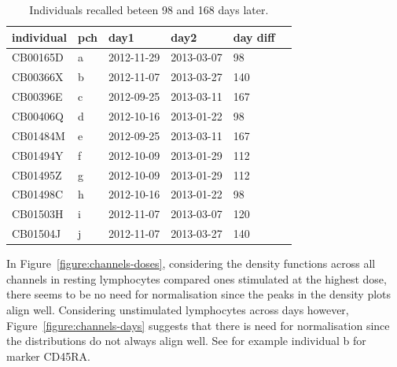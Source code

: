 \begin{table}[ht]
\centering
\begin{tabular}{llllll}
  \hline
  individual & pch & day1 & day2 & day diff \\ 
  \hline
CB00165D & a & 2012-11-29 & 2013-03-07 & 98 \\ 
CB00366X & b & 2012-11-07 & 2013-03-27 & 140 \\ 
CB00396E & c & 2012-09-25 & 2013-03-11 & 167 \\ 
CB00406Q & d & 2012-10-16 & 2013-01-22 & 98 \\ 
CB01484M & e & 2012-09-25 & 2013-03-11 & 167 \\ 
CB01494Y & f & 2012-10-09 & 2013-01-29 & 112 \\ 
CB01495Z & g & 2012-10-09 & 2013-01-29 & 112 \\ 
CB01498C & h & 2012-10-16 & 2013-01-22 & 98 \\ 
CB01503H & i & 2012-11-07 & 2013-03-07 & 120 \\ 
CB01504J & j & 2012-11-07 & 2013-03-27 & 140 \\ 
   \hline
\end{tabular}
\caption{ \label{figure:recalled-individuals} Individuals recalled beteen 98 and 168 days later. }
\end{table}

In Figure~\ref{figure:channels-doses}, considering the density functions across all channels in resting lymphocytes compared ones stimulated at the highest dose,
there seems to be no need for normalisation since the peaks in the density plots align well.
Considering unstimulated lymphocytes across days however, Figure~\ref{figure:channels-days} suggests that there is need for normalisation since the distributions do not always align well.
See for example individual b for marker CD45RA.

